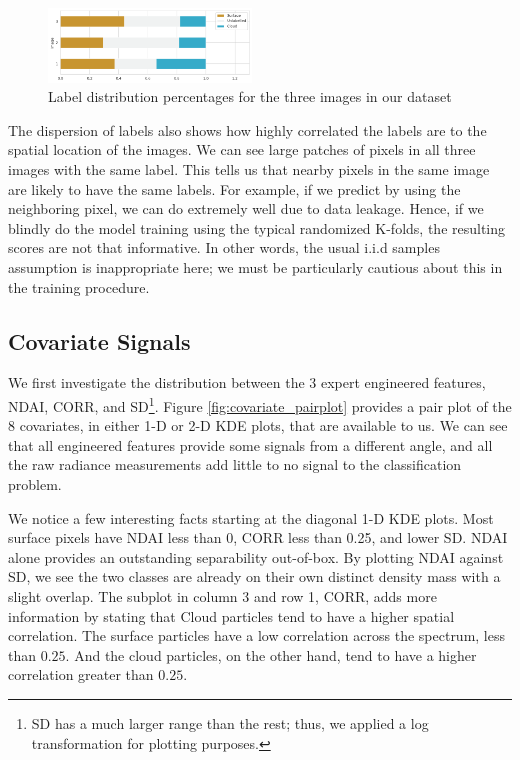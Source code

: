 \documentclass[11pt, letterpaper, journal]{IEEEtran}
\begin{document}
\begin{figure}[!h]
\centering
\includegraphics[width=0.48\textwidth]{2.a.png}
\caption{Label distribution percentages for the three images in our dataset}
\label{fig:label_dist}
\end{figure}

The dispersion of labels also shows how highly correlated the labels are to the spatial location of the images. We can see large patches of pixels in all three images with the same label. This tells us that nearby pixels in the same image are likely to have the same labels. For example, if we predict by using the neighboring pixel, we can do extremely well due to data leakage. Hence, if we blindly do the model training using the typical randomized K-folds, the resulting scores are not that informative. In other words, the usual i.i.d samples assumption is inappropriate here; we must be particularly cautious about this in the training procedure.


\subsection{Covariate Signals}
We first investigate the distribution between the 3 expert engineered features, NDAI, CORR, and SD\footnote{SD has a much larger range than the rest; thus, we applied a log transformation for plotting purposes.}. Figure \ref{fig:covariate_pairplot} provides a pair plot of the 8 covariates, in either 1-D or 2-D KDE plots, that are available to us. We can see that all engineered features provide some signals from a different angle, and all the raw radiance measurements add little to no signal to the classification problem.

We notice a few interesting facts starting at the diagonal 1-D KDE plots. Most surface pixels have NDAI less than 0, CORR less than 0.25, and lower SD. NDAI alone provides an outstanding separability out-of-box. By plotting NDAI against SD, we see the two classes are already on their own distinct density mass with a slight overlap. The subplot in column 3 and row 1, CORR, adds more information by stating that Cloud particles tend to have a higher spatial correlation. The surface particles have a low correlation across the spectrum, less than $0.25$. And the cloud particles, on the other hand, tend to have a higher correlation greater than $0.25$.
\end{document}
